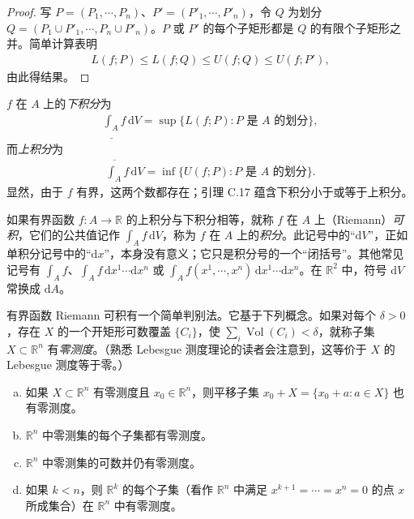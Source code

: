 \documentclass[../../main.tex]{subfiles}
\begin{document}
\begin{proof}
写 $P=(P_1,\cdots ,P_n)$、$P'=(P'_1,\cdots ,P'_n)$，令 $Q$ 为划分 $Q=(P_1\cup P'_1,\cdots ,P_n\cup P'_n)$。$P$ 或 $P'$ 的每个子矩形都是 $Q$ 的有限个子矩形之并。简单计算表明
\begin{align*}
L(f;P)\leqslant L(f;Q)\leqslant U(f;Q)\leqslant U(f;P'),
\end{align*}
由此得结果。
\end{proof}

$f$ 在 $A$ 上的\emph{下积分}为
\begin{align*}
\underline{\int_A}f\,\mathrm{d}V=\sup\{L(f;P):P\text{ 是 }A\text{ 的划分}\},
\end{align*}
而\emph{上积分}为
\begin{align*}
\overline{\int_A}f\,\mathrm{d}V=\inf\{U(f;P):P\text{ 是 }A\text{ 的划分}\}.
\end{align*}
显然，由于 $f$ 有界，这两个数都存在；引理 C.17 蕴含下积分小于或等于上积分。

如果有界函数 $f:A\to\mathbb R$ 的上积分与下积分相等，就称 $f$ 在 $A$ 上（Riemann）\emph{可积}，它们的公共值记作 $\int_A f\,\mathrm{d}V$，称为 $f$ 在 $A$ 上的\emph{积分}。此记号中的“$\mathrm{d}V$”，正如单积分记号中的“$\mathrm{d}x$”，本身没有意义；它只是积分号的一个“闭括号”。其他常见记号有 $\int_A f$、$\int_A f\,\mathrm{d}x^1\cdots\mathrm{d}x^n$ 或 $\int_A f(x^1,\cdots ,x^n)\,\mathrm{d}x^1\cdots\mathrm{d}x^n$。在 $\mathbb R^2$ 中，符号 $\mathrm{d}V$ 常换成 $\mathrm{d}A$。

有界函数 Riemann 可积有一个简单判别法。它基于下列概念。如果对每个 $\delta>0$，存在 $X$ 的一个开矩形可数覆盖 $\{C_i\}$，使 $\sum_i\operatorname{Vol}(C_i)<\delta$，就称子集 $X\subset\mathbb R^n$ 有\emph{零测度}。（熟悉 Lebesgue 测度理论的读者会注意到，这等价于 $X$ 的 Lebesgue 测度等于零。）

\begin{proposition}[零测集的性质]\label{proposition:appC-null-set-properties}
\begin{enumerate}[(a)]
\item 如果 $X\subset\mathbb R^n$ 有零测度且 $x_0\in\mathbb R^n$，则平移子集 $x_0+X=\{x_0+a:a\in X\}$ 也有零测度。
\item $\mathbb R^n$ 中零测集的每个子集都有零测度。
\item $\mathbb R^n$ 中零测集的可数并仍有零测度。
\item 如果 $k<n$，则 $\mathbb R^k$ 的每个子集（看作 $\mathbb R^n$ 中满足 $x^{k+1}=\cdots=x^n=0$ 的点 $x$ 所成集合）在 $\mathbb R^n$ 中有零测度。
\end{enumerate}
\end{proposition}
\end{document}
